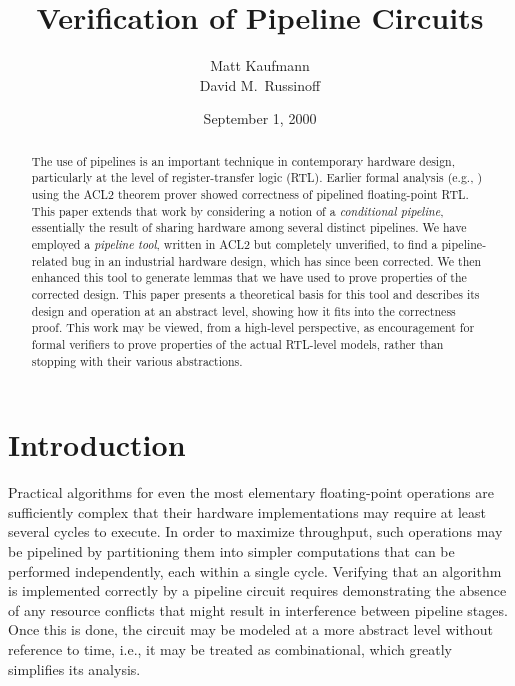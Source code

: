 \documentclass{article}
\begin{document}
\title{Verification of Pipeline Circuits}

\date{September 1, 2000}

\author{Matt Kaufmann\\David M.~Russinoff}

\maketitle

\newtheorem{theorem}{Theorem}
\newtheorem{definition}{Definition}[section]
\newtheorem{lemma}{Lemma}[section]
\newtheorem{corollary}[lemma]{Corollary}

\newcommand{\tm}{$^{[tm]}$}

\begin{abstract}
The use of pipelines is an important technique in contemporary hardware design,
particularly at the level of register-transfer logic (RTL).  Earlier formal
analysis (e.g., \cite{mult}) using the ACL2 theorem prover showed correctness
of pipelined floating-point RTL.  This paper extends that work by considering a
notion of a {\it conditional pipeline}, essentially the result of sharing
hardware among several distinct pipelines.  We have employed a {\it pipeline
tool}, written in ACL2 but completely unverified, to find a pipeline-related
bug in an industrial hardware design, which has since been corrected.  We then
enhanced this tool to generate lemmas that we have used to prove properties of
the corrected design.  This paper presents a theoretical basis for this tool
and describes its design and operation at an abstract level, showing how it
fits into the correctness proof.  This work may be viewed, from a high-level
perspective, as encouragement for formal verifiers to prove properties of the
actual RTL-level models, rather than stopping with their various abstractions.
\end{abstract}

\section{Introduction}\label{intro}

Practical algorithms for even the most elementary floating-point
operations are sufficiently complex that their hardware
implementations may require at least several cycles to execute.  In order
to maximize throughput, such operations may be pipelined by partitioning
them into simpler computations that can be performed independently,
each within a single cycle. Verifying that an algorithm is implemented
correctly by a pipeline circuit requires demonstrating the absence of
any resource conflicts that might result in interference between
pipeline stages.  Once this is done, the circuit may be modeled at a
more abstract level without reference to time, i.e., it may be
treated as combinational, which greatly simplifies its analysis.
\end{document}
